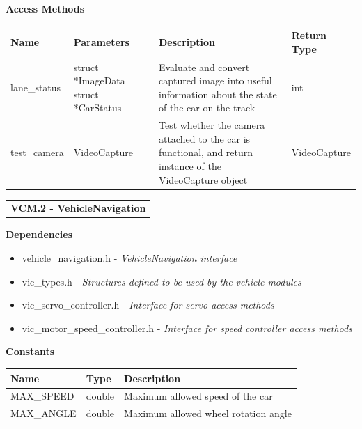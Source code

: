 \documentclass [10pt]{article}
\begin{document}
\textbf{Access Methods}\\ 


\begin{longtable}{| p{ }  p{ } p{} p{}|} \hline

 \textbf{Name} & \textbf{Parameters} & \textbf{Description} &\textbf{Return Type} \\ \hline

\rowcolor{tableCell} lane\_status & struct *ImageData \newline struct *CarStatus &  Evaluate and convert captured image into useful information about the state of the car on the track & int \\ \hline

 test\_camera & VideoCapture &  Test whether the camera attached to the car is functional, and return instance of the VideoCapture object & VideoCapture \\ \hline



\end{longtable}



        
        
    





\begin{longtable}{p{}}
\rowcolor{subsectionC}\textbf{VCM.2 - VehicleNavigation} \\
\end{longtable}

\textbf{Dependencies} 
\begin{itemize} 
\itemsep 0em 
\item vehicle\_navigation.h - \textit{VehicleNavigation interface}
\item vic\_types.h - \textit{Structures defined to be used by the vehicle modules}
\item vic\_servo\_controller.h - \textit{Interface for servo access methods}
\item vic\_motor\_speed\_controller.h - \textit{Interface for speed controller access methods}
\end{itemize}

\textbf{Constants}\\ 
\begin{longtable}{| p{ }  p{ } p{}|} \hline

 \textbf{Name} & \textbf{Type} & \textbf{Description} \\ \hline
\rowcolor{tableCell} MAX\_SPEED & double & Maximum allowed speed of the car\\ \hline
 MAX\_ANGLE & double & Maximum allowed wheel rotation angle\\ \hline


\end{longtable}
\end{document}
